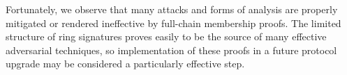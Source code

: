 \documentclass{article}
\theoremstyle{definition}
\begin{document}
Fortunately, we observe that many attacks and forms of analysis are properly mitigated or rendered ineffective by full-chain membership proofs.
The limited structure of ring signatures proves easily to be the source of many effective adversarial techniques, so implementation of these proofs in a future protocol upgrade may be considered a particularly effective step.


\nocite{*}


\end{document}

